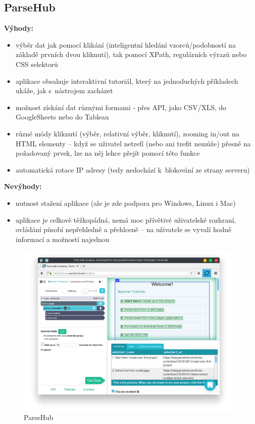 \documentclass[thesis=B,czech]{FITthesis2}[2012/06/26]
\begin{document}
	\subsection{ParseHub}
	\textbf{Výhody:}
	\begin{itemize}
		\item výběr dat jak pomocí klikání (inteligentní hledání vzorců/podobností na základě prvních dvou kliknutí), tak pomocí XPath, regulárních výrazů nebo CSS selektorů
		\item aplikace obsahuje interaktivní tutoriál, který na jednoduchých příkladech ukáže, jak s~nástrojem zacházet
		\item možnost získání dat různými formami - přes API, jako CSV/XLS, do GoogleSheets nebo do Tableau
		\item různé módy kliknutí (výběr, relativní výběr, kliknutí), zooming in/out na HTML elementy -- když se uživatel netrefí (nebo ani trefit nemůže) přesně na požadovaný prvek, lze na něj lehce přejít pomocí této funkce
		\item automatická rotace IP adresy (tedy nedochází k~blokování ze strany serveru)
	\end{itemize}
	\textbf{Nevýhody:}
	\begin{itemize}
		\item nutnost stažení aplikace (ale je zde podpora pro Windows, Linux i Mac)
		\item aplikace je celkově těžkopádná, nemá moc přívětivé uživatelské rozhraní, ovládání působí nepřehledně a přehlceně -- na uživatele se vyvalí hodně informací a možností najednou
	\end{itemize}
	\begin{figure}[h]
		\includegraphics[width=\linewidth]{images/ParseHub.png}
		\caption{ParseHub\cite[snímek pořídil autor]{parsehub}}
		\label{fig:parseHub}
	\end{figure}
	
\end{document}
